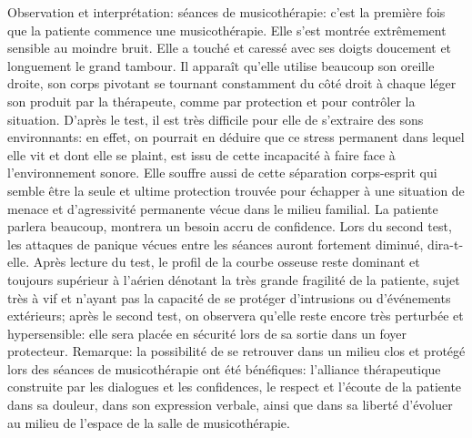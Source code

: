             Observation et interprétation:  séances de musicothérapie: c'est la première fois que la patiente 
            commence une  musicothérapie.
            Elle s'est montrée extrêmement sensible au 
            moindre bruit.
            Elle a touché et caressé avec ses doigts doucement et longuement le grand tambour. 
            Il apparaît qu'elle utilise beaucoup son oreille droite, son corps pivotant  se tournant 
            constamment du 
            côté droit à chaque léger son produit par la thérapeute, comme par protection et  pour contrôler la 
            situation. 
            D'après le test, il est très difficile pour elle de s'extraire des sons environnants: en effet, on 
            pourrait en 
            déduire que ce stress permanent dans lequel elle vit et dont elle se plaint, est issu de cette 
            incapacité à 
            faire face à l'environnement sonore. Elle souffre aussi de cette séparation corps-esprit qui semble 
            être  
      la seule et ultime protection trouvée pour échapper à une situation  de menace  et d'agressivité 
      permanente vécue dans le milieu familial.
            La patiente parlera beaucoup, montrera un besoin accru de confidence. Lors du second test,  les 
            attaques de panique vécues entre les séances auront fortement 
            diminué, dira-t-elle. Après lecture du test, le profil de la courbe osseuse reste dominant et 
            toujours  
            supérieur à l'aérien dénotant la très grande fragilité de la patiente, 
            sujet très à vif et n'ayant pas la capacité de se protéger d'intrusions ou d'événements extérieurs; 
            après le second 
            test, on observera  qu'elle reste encore très 
            perturbée et hypersensible: elle sera placée en sécurité 
            lors de sa sortie dans un foyer protecteur. 
          Remarque: la possibilité de se retrouver dans un milieu clos et protégé lors des séances de 
            musicothérapie ont été bénéfiques:  l'alliance thérapeutique construite par les dialogues et les 
            confidences,  le respect et l'écoute de la patiente dans sa douleur, dans son expression verbale, 
            ainsi 
            que dans sa liberté d'évoluer au milieu de l'espace de la salle de musicothérapie.
